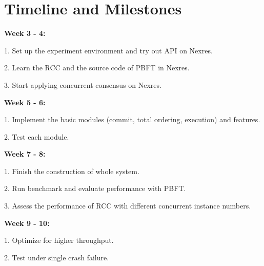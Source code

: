 \section{Timeline and Milestones}
\textbf{Week 3 - 4:}
\par 1. Set up the experiment environment and try out API on Nexres.
\par 2. Learn the RCC and the source code of PBFT in Nexres.
\par 3. Start applying concurrent consensus on Nexres. 

\noindent
\textbf{Week 5 - 6:}
\par 1. Implement the basic modules (commit, total ordering, execution) and features.
\par 2. Test each module.

\noindent
\textbf{Week 7 - 8:}
\par 1. Finish the construction of whole system.
\par 2. Run benchmark and evaluate performance with PBFT.
\par 3. Assess the performance of RCC with different concurrent instance numbers.

\noindent
\textbf{Week 9 - 10:}
\par 1. Optimize for higher throughput.
\par 2. Test under single crash failure.